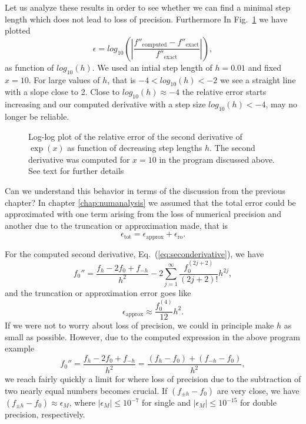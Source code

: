 Let us analyze these results in order to see whether we can find
a minimal step length which does not lead to loss of precision.
Furthermore 
In Fig.~\ref{fig:lossofprecision} we have plotted
\[
   \epsilon=log_{10}\left(\left|\frac{f''_{\mathrm{computed}}-f''_{\mathrm{exact}}}
                 {f''_{\mathrm{exact}}}\right|\right),
\]
as function of $log_{10}(h)$. 
We used an intial step length of $h=0.01$ and fixed $x=10$.
For large values of $h$, that is $-4 < log_{10}(h) < -2$  we see 
a straight line with a slope close to 2. Close to
$log_{10}(h) \approx -4$
the relative error starts increasing and our computed derivative with 
a step size $log_{10}(h)<  -4$, may no longer be reliable.
\begin{figure}
\begin{center}
%
\end{center}
\caption{Log-log plot of the relative error of the second derivative of $\exp{(x)}$ 
as function of decreasing step lengths $h$. The second derivative
was computed for $x=10$ in the program discussed above. See text for
further details\label{fig:lossofprecision}}
\end{figure}

Can we understand this behavior in terms of the discussion from the previous
chapter?
In chapter \ref{chap:numanalysis} we assumed that the total error
could be approximated with one term arising from the loss of numerical
precision and another due to the truncation or approximation made,
that is
\[
   \epsilon_{\mathrm{tot}}=\epsilon_{\mathrm{approx}}+\epsilon_{\mathrm{ro}}.
\]

For the computed second derivative, Eq.\ (\ref{eq:seconderivative}), we have 
\[
 f_0''=\frac{ f_h -2f_0 +f_{-h}}{h^2}-2\sum_{j=1}^{\infty}\frac{f_0^{(2j+2)}}{(2j+2)!}h^{2j},
\]
and the truncation or approximation error goes like
\[
  \epsilon_{\mathrm{approx}}\approx \frac{f_0^{(4)}}{12}h^{2}.
\]
If we were not to worry about loss of precision, we could in principle
make $h$ as small as possible. 
However, due to the computed expression in the above program example
\[
 f_0''=\frac{ f_h -2f_0 +f_{-h}}{h^2}=\frac{ (f_h -f_0) +(f_{-h}-f_0)}{h^2},
\]
we reach fairly quickly a limit for where loss of precision due to the subtraction
of two nearly equal numbers becomes crucial. 
If $(f_{\pm h} -f_0)$ are very close, we have
$(f_{\pm h} -f_0)\approx \epsilon_M$, where $|\epsilon_M|\le 10^{-7}$ for single and
$|\epsilon_M|\le 10^{-15}$ for double precision, respectively.

